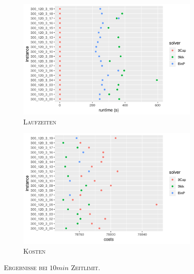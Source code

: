 \begin{figure}[H]
\centering
\begin{subfigure}[b]{0.4\textwidth}
\centering
\includegraphics[width=1.3\textwidth]{img/solver_instance_time_b=3_m_600s.png}
\caption{\textsc{Laufzeiten}}
\label{fig:b=3_m_runtimes}
\end{subfigure}
\hfill
\begin{subfigure}[b]{0.4\textwidth}
\centering
\includegraphics[width=1.3\textwidth]{img/solver_instance_cost_b=3_m_600s.png}
\caption{\textsc{Kosten}}
\label{fig:b=3_m_costs}
\end{subfigure}
\caption{\textsc{Ergebnisse bei $10min$ Zeitlimit}.}
\end{figure}

